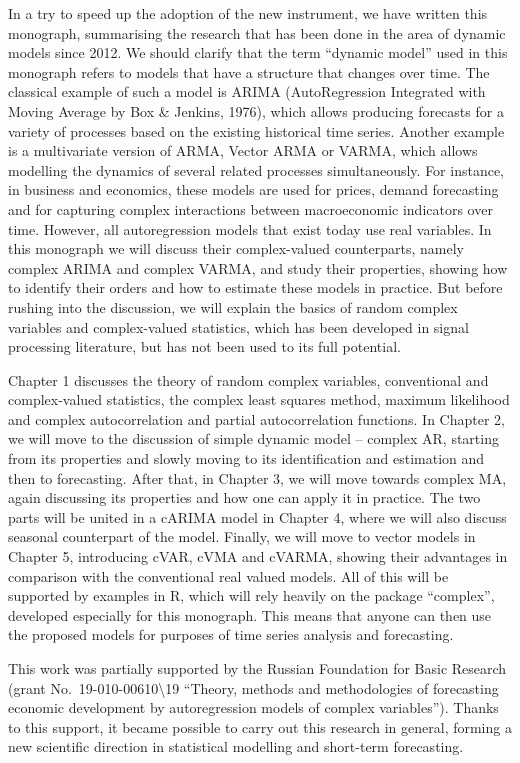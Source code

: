 \documentclass[
]{book}
\begin{document}
In a try to speed up the adoption of the new instrument, we have written this monograph, summarising the research that has been done in the area of dynamic models since 2012. We should clarify that the term ``dynamic model'' used in this monograph refers to models that have a structure that changes over time. The classical example of such a model is ARIMA (AutoRegression Integrated with Moving Average by Box \& Jenkins, 1976), which allows producing forecasts for a variety of processes based on the existing historical time series. Another example is a multivariate version of ARMA, Vector ARMA or VARMA, which allows modelling the dynamics of several related processes simultaneously. For instance, in business and economics, these models are used for prices, demand forecasting and for capturing complex interactions between macroeconomic indicators over time.
However, all autoregression models that exist today use real variables. In this monograph we will discuss their complex-valued counterparts, namely complex ARIMA and complex VARMA, and study their properties, showing how to identify their orders and how to estimate these models in practice. But before rushing into the discussion, we will explain the basics of random complex variables and complex-valued statistics, which has been developed in signal processing literature, but has not been used to its full potential.

Chapter 1 discusses the theory of random complex variables, conventional and complex-valued statistics, the complex least squares method, maximum likelihood and complex autocorrelation and partial autocorrelation functions. In Chapter 2, we will move to the discussion of simple dynamic model -- complex AR, starting from its properties and slowly moving to its identification and estimation and then to forecasting. After that, in Chapter 3, we will move towards complex MA, again discussing its properties and how one can apply it in practice. The two parts will be united in a cARIMA model in Chapter 4, where we will also discuss seasonal counterpart of the model. Finally, we will move to vector models in Chapter 5, introducing cVAR, cVMA and cVARMA, showing their advantages in comparison with the conventional real valued models. All of this will be supported by examples in R, which will rely heavily on the package ``complex'', developed especially for this monograph. This means that anyone can then use the proposed models for purposes of time series analysis and forecasting.

This work was partially supported by the Russian Foundation for Basic Research (grant No.~19-010-00610\textbackslash19 ``Theory, methods and methodologies of forecasting economic development by autoregression models of complex variables''). Thanks to this support, it became possible to carry out this research in general, forming a new scientific direction in statistical modelling and short-term forecasting.
\end{document}
